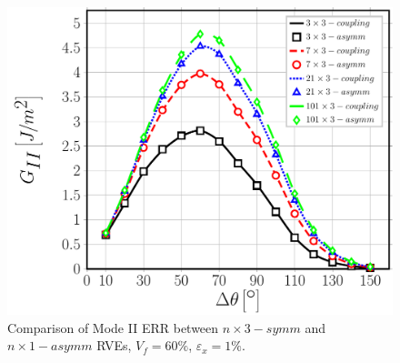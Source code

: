 \begin{figure}[!htb]
\centering
  \includegraphics[width=\textwidth]{paperD/nxk-coupling-vf60-GII.pdf}
\caption{Comparison of Mode II ERR between $n \times 3−symm$ and $n \times 1−asymm$ RVEs, $V_{f}=60\%$, $\varepsilon_{x}=1\%$.}\label{paperD:fig:nxk-GII}
\end{figure}

